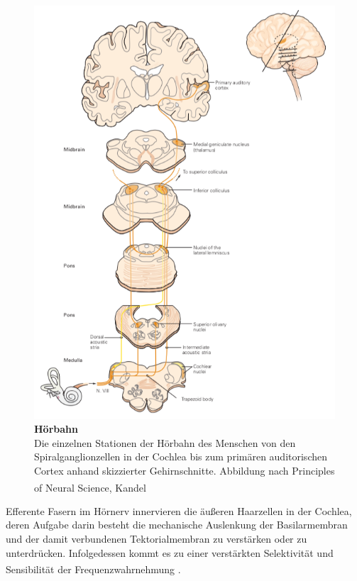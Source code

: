 \documentclass[12pt,a4paper,pdftex]{article}
\begin{document}
\begin{figure}[H]
    \centering
    \includegraphics{pictures/auditory/hoerbahn_pathway.png}
    \caption[Hörbahn]{\textbf{Hörbahn} \\
    Die einzelnen Stationen der Hörbahn des Menschen von den Spiralganglionzellen in der Cochlea bis zum primären auditorischen Cortex anhand skizzierter Gehirnschnitte. Abbildung nach Principles of Neural Science, Kandel \textsuperscript{\cite[30]{kandel2013principles}}}
    \label{fig:hoerbahn_pathway}
\end{figure}

\newpage
\noindent Efferente Fasern im Hörnerv innervieren die äußeren Haarzellen  in der Cochlea, deren Aufgabe darin besteht die mechanische Auslenkung der Basilarmembran und der damit verbundenen Tektorialmembran  zu verstärken oder zu unterdrücken. Infolgedessen kommt es zu einer verstärkten Selektivität und Sensibilität der Frequenzwahrnehmung \textsuperscript{\cite[22]{paxinos2014rat}}.
\end{document}
